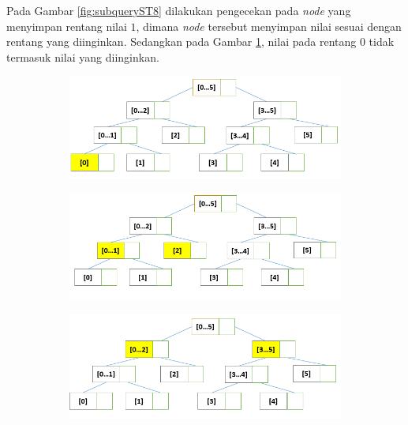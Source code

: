 \quad Pada Gambar \ref{fig:subqueryST8} dilakukan pengecekan pada \textit{node} yang menyimpan rentang nilai $1$, dimana \textit{node} tersebut menyimpan nilai sesuai dengan rentang yang diinginkan. Sedangkan pada Gambar \ref{fig:subqueryST9}, nilai pada rentang $0$ tidak termasuk nilai yang diinginkan. 
\begin{figure}[H]
	\begin{subfigure}{.5\textwidth}
		\centering
		\includegraphics[scale=0.3]{assets/images/Query_ST_9.PNG}
		\caption{}
		\label{fig:subqueryST9}
	\end{subfigure}
	\begin{subfigure}{.5\textwidth}
		\centering
		\includegraphics[scale=0.3]{assets/images/Query_ST_10.PNG}
		\caption{}
		\label{fig:subqueryST10}
	\end{subfigure}
	\begin{subfigure}{.5\textwidth}
		\centering \includegraphics[scale=0.3]{assets/images/Query_ST_11.PNG}
		\caption{}
		\label{fig:subqueryST11}
	\end{subfigure}

\end{figure}
